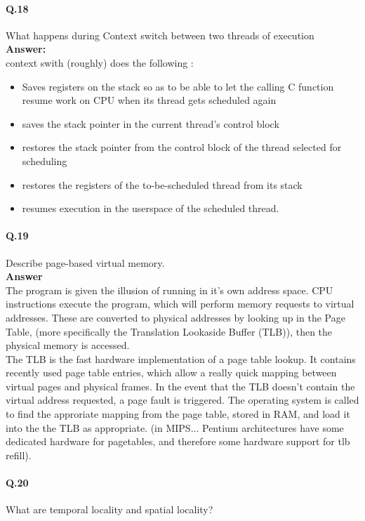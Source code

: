 \documentclass[a4paper,10pt]{article}
\begin{document}
\paragraph{Q.18}
What happens during Context switch between two threads of execution\\
\textbf{Answer:}\\
context swith (roughly) does the following :
\begin{itemize}
\item Saves registers on the stack so as to be able to let the calling C
function resume work on CPU when its thread gets scheduled again
\item saves the stack pointer in the current thread's control block
\item restores the stack pointer from the control block of the thread selected
for scheduling
\item restores the registers of the to-be-scheduled thread from its stack
\item resumes execution in the userspace of the scheduled thread.
 
\end{itemize}

\paragraph{Q.19}
Describe page-based virtual memory.
\\
\textbf{Answer}\\
The program is given the illusion of running in it's own address space.
CPU instructions execute the program, which will perform memory requests to
virtual addresses. These are converted to physical addresses by looking up in
the Page Table, (more specifically the Translation Lookaside Buffer (TLB)), then
the physical memory is accessed.
\\
The TLB is the fast hardware implementation of a page table lookup. It contains
recently used page table entries, which allow a really quick mapping between
virtual pages and physical frames. In the event that the TLB doesn't contain the
virtual address requested, a page fault is triggered. The operating system is
called to find the approriate mapping from the page table, stored in RAM, and
load it into the the TLB as appropriate. (in MIPS... Pentium architectures have
some dedicated hardware for pagetables, and therefore some hardware support for
tlb refill).

\paragraph{Q.20}
What are temporal locality and spatial locality?
\end{document}
